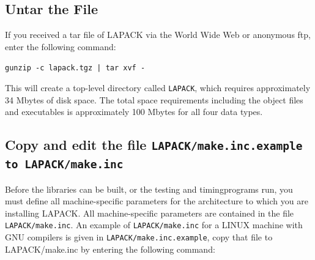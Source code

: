 \documentclass[11pt]{report}
\begin{document}
\begin{enumerate}
%
%
\end{enumerate}

\subsection{Untar the File}

If you received a tar file of LAPACK via the World Wide
Web or anonymous ftp, enter the following command:

\begin{list}{}
\item{\texttt{gunzip -c lapack.tgz | tar xvf -}}
\end{list}

\noindent
This will create a top-level directory called \texttt{LAPACK}, which
requires approximately 34 Mbytes of disk space.
The total space requirements including the object files and executables
is approximately 100 Mbytes for all four data types.

\subsection{Copy and edit the file \texttt{LAPACK/make.inc.example to LAPACK/make.inc}}

Before the libraries can be built, or the testing and timing\footnotemark[\value{footnote}] programs
run, you must define all machine-specific parameters for the
architecture to which you are installing LAPACK.  All machine-specific
parameters are contained in the file \texttt{LAPACK/make.inc}.
An example of  \texttt{LAPACK/make.inc} for a LINUX machine with GNU compilers is given
in \texttt{LAPACK/make.inc.example}, copy that file to LAPACK/make.inc by entering the following command:
\end{document}
